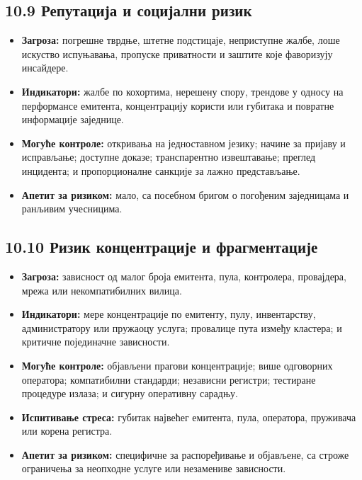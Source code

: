 \documentclass[11pt]{article}
\begin{document}
\subsection*{10.9 Репутација и социјални ризик}

\begin{itemize}[leftmargin=*]
\item \textbf{Загроза:} погрешне тврдње, штетне подстицаје, неприступне жалбе, лоше искуство испуњавања, пропуске приватности и заштите које фаворизују инсайдере.
\item \textbf{Индикатори:} жалбе по кохортима, нерешену спору, трендове у односу на перформансе емитента, концентрацију користи или губитака и повратне информације заједнице.
\item \textbf{Могуће контроле:} откривања на једноставном језику; начине за пријаву и исправљање; доступне доказе; транспарентно извештавање; преглед инцидента; и пропорционалне санкције за лажно представљање.
\item \textbf{Апетит за ризиком:} мало, са посебном бригом о погођеним заједницама и ранљивим учесницима.
\end{itemize}
\subsection*{10.10 Ризик концентрације и фрагментације}

\begin{itemize}[leftmargin=*]
\item \textbf{Загроза:} зависност од малог броја емитента, пула, контролера, провајдера, мрежа или некомпатибилних вилица.
\item \textbf{Индикатори:} мере концентрације по емитенту, пулу, инвентарству, администратору или пружаоцу услуга; провалице пута између кластера; и критичне појединачне зависности.
\item \textbf{Могуће контроле:} објављени прагови концентрације; више одговорних оператора; компатибилни стандарди; независни регистри; тестиране процедуре излаза; и сигурну оперативну сарадњу.
\item \textbf{Испитивање стреса:} губитак највећег емитента, пула, оператора, пруживача или корена регистра.
\item \textbf{Апетит за ризиком:} специфичне за распоређивање и објављене, са строже ограничења за неопходне услуге или незамениве зависности.
\end{itemize}
\end{document}
